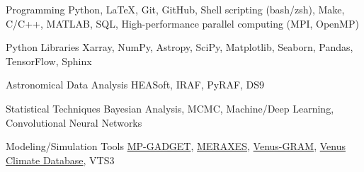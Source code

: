 
\begin{cvskills}

    \cvskill
    {Programming} %
    {Python, \LaTeX, Git, GitHub, Shell scripting (bash/zsh), Make, C/C++, MATLAB, SQL, High-performance parallel computing (MPI, OpenMP)} %

    \cvskill
    {Python Libraries} %
    {Xarray, NumPy, Astropy, SciPy, Matplotlib, Seaborn, Pandas, TensorFlow, Sphinx} %

    \cvskill
    {Astronomical Data Analysis} %
    {HEASoft, IRAF, PyRAF, DS9} %

    \cvskill
    {Statistical Techniques} %
    {Bayesian Analysis, MCMC, Machine/Deep Learning, Convolutional Neural Networks} %

    \cvskill
    {Modeling/Simulation Tools} %
    {\href{https://github.com/MP-Gadget/MP-Gadget}{MP-GADGET},
        \href{https://github.com/meraxes-devs/meraxes}{MERAXES},
        \href{https://software.nasa.gov/software/MFS-33888-1}{Venus-GRAM},
        \href{https://ui.adsabs.harvard.edu/abs/2024EPSC...17..430L/abstract}{Venus Climate Database},
    VTS3} %

\end{cvskills}
